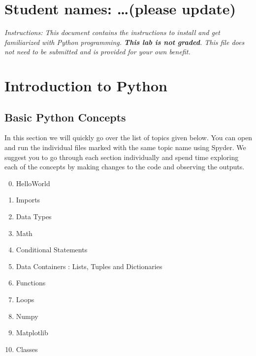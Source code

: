 \documentclass{cmc}
\begin{document}
\maketitle
\pagestyle{fancy}
\tableofcontents
{} 

\newpage
\section*{Student names: \ldots (please update)}

\textit{Instructions: This document contains the instructions to
  install and get familiarized with Python programming.  \textbf{This
    lab is not graded}. This file does not need to be submitted and is
  provided for your own benefit.}

\section{Introduction to Python}

\subsection{Basic Python Concepts}

In this section we will quickly go over the list of topics given
below.  You can open and run the individual files marked with the same
topic name using Spyder.  We suggest you to go through each section
individually and spend time exploring each of the concepts by making
changes to the code and observing the outputs.

\begin{enumerate}
  \setcounter{enumi}{-1}
\item HelloWorld
\item Imports
\item Data Types
\item Math
\item Conditional Statements
\item Data Containers : Lists, Tuples and Dictionaries
\item Functions
\item Loops
\item Numpy
\item Matplotlib
\item Classes
\end{enumerate}
\end{document}
